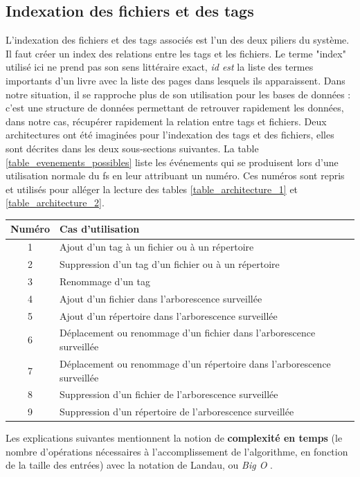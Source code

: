 \subsection{Indexation des fichiers et des tags}
L'indexation des fichiers et des tags associés est l'un des deux piliers du système. Il faut créer 
un index des relations entre les tags et les fichiers. Le terme "index" utilisé ici ne 
prend pas son sens littéraire exact, \textit{id est} la liste des termes importants 
d'un livre avec la liste des pages dans lesquels ils apparaissent. Dans notre situation, il se 
rapproche plus de son utilisation pour les bases de données : c'est une structure de données 
permettant de retrouver rapidement les données, dans notre cas, récupérer rapidement la relation 
entre tags et fichiers. Deux architectures ont été imaginées pour l'indexation des tags et des fichiers, 
elles sont décrites dans les deux sous-sections suivantes. La table \ref{table_evenements_possibles} liste 
les événements qui se produisent lors d'une utilisation normale du \acrshort{fs} en leur attribuant 
un numéro. Ces numéros sont repris et utilisés pour alléger la lecture des tables \ref{table_architecture_1} 
et \ref{table_architecture_2}.
\begin{center}
    \begin{tabularx}{15cm}{|c|X|} \hline
        \textbf{Numéro} & \textbf{Cas d'utilisation} \\ \hline
        1 & Ajout d'un tag à un fichier ou à un répertoire \\ \hline
        2 & Suppression d'un tag d'un fichier ou à un répertoire \\ \hline
        3 & Renommage d'un tag \\ \hline
        4 & Ajout d'un fichier dans l'arborescence surveillée \\ \hline
        5 & Ajout d'un répertoire dans l'arborescence surveillée \\ \hline
        6 & Déplacement ou renommage d'un fichier dans l'arborescence surveillée \\ \hline
        7 & Déplacement ou renommage d'un répertoire dans l'arborescence surveillée \\ \hline
        8 & Suppression d'un fichier de l'arborescence surveillée \\ \hline
        9 & Suppression d'un répertoire de l'arborescence surveillée \\ \hline
    \end{tabularx}
    \label{table_evenements_possibles}
\end{center}
Les explications suivantes mentionnent la notion de \textbf{complexité en temps} (le nombre d'opérations 
nécessaires à l'accomplissement de l'algorithme, en fonction de la taille des entrées) avec la notation 
de Landau, ou \textit{Big O} \cite{ref54}.

